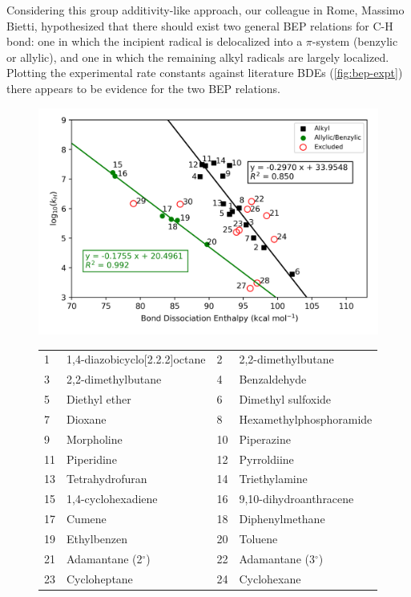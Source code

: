 Considering this group additivity-like approach, our colleague in Rome, Massimo Bietti, hypothesized that there should exist two general BEP relations for C-H bond: one in which the incipient radical is delocalized into a $\pi$-system (benzylic or allylic), and one in which the remaining alkyl radicals are largely localized. Plotting the experimental rate constants against literature BDEs (\ref{fig:bep-expt}) there appears to be evidence for the two BEP relations.

\begin{figure}[!htbp]
  \centering
  \includegraphics[width=\textwidth]{figures/bep-expt}
\begin{tabularx}{\textwidth}{| l X l X |}
  \hline
  1 & 1,4-diazobicyclo[2.2.2]octane & 2 & 2,2-dimethylbutane \\
  3 & 2,2-dimethylbutane & 4 & Benzaldehyde \\
  5 & Diethyl ether & 6 & Dimethyl sulfoxide \\
  7 & Dioxane & 8 & Hexamethylphosphoramide \\
  9 & Morpholine & 10 & Piperazine \\
  11 & Piperidine & 12 & Pyrroldiine \\
  13 & Tetrahydrofuran & 14 & Triethylamine \\
  15 & 1,4-cyclohexadiene & 16 & 9,10-dihydroanthracene \\
  17 & Cumene & 18 & Diphenylmethane \\
  19 & Ethylbenzen & 20 & Toluene \\
  21 & Adamantane (2$^\circ$) & 22 & Adamantane (3$^\circ$) \\
  23 & Cycloheptane & 24 & Cyclohexane \\

\end{tabularx}
\end{figure}
